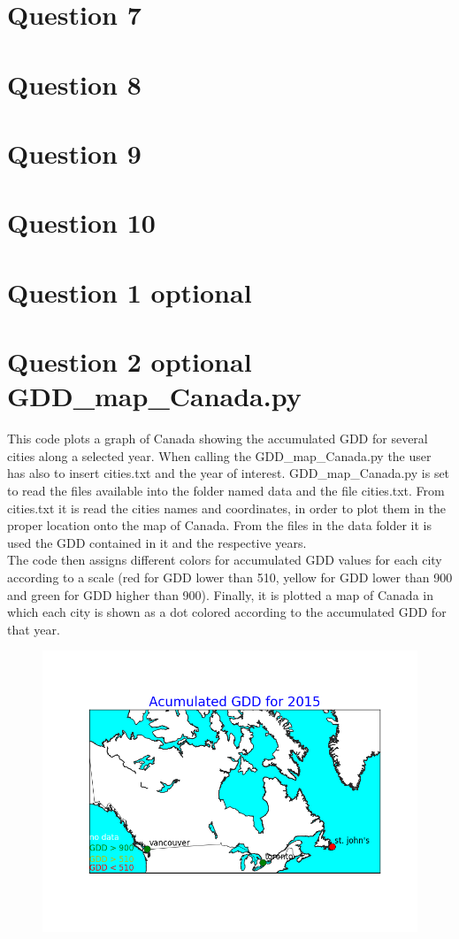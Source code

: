 \documentclass[12pt,letterpaper]{article}
\begin{document}
\section{Question 7}
\section{Question 8}
\section{Question 9}
\section{Question 10}
\section{Question 1 optional}
\section{Question 2 optional GDD\_map\_Canada.py}
This code plots a graph of Canada showing the accumulated GDD for several cities along a selected year. When calling the GDD\_map\_Canada.py the user has also to insert cities.txt and the year of interest. GDD\_map\_Canada.py is set to read the files available into the folder named data and the file cities.txt. From cities.txt it is read the cities names and coordinates, in order to plot them in the proper location onto the map of Canada. From the files in the data folder it is used the GDD contained in it and the respective years. \\
The code then assigns different colors for accumulated GDD values for each city according to a scale (red for GDD lower than 510, yellow for GDD lower than 900 and green for GDD higher than 900). Finally, it is plotted a map of Canada in which each city is shown as a dot colored according to the accumulated GDD for that year.
\begin{figure}
\centering
\includegraphics[scale=0.6]{GDDMap_2015.png}
\end{figure}
\end{document}
